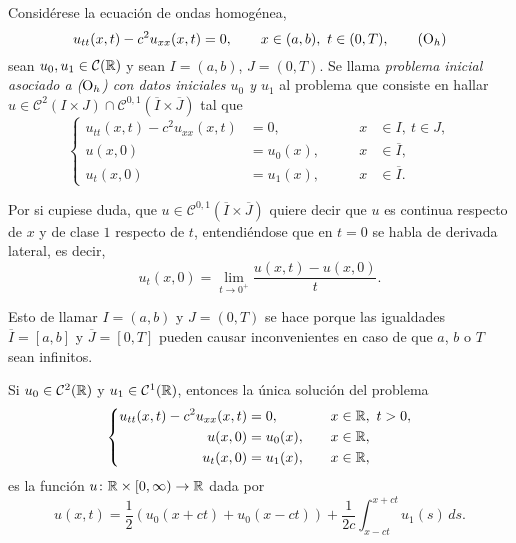 \documentclass[a4paper, 12pt, extrafontsizes]{memoir}
\begin{document}
\begin{definition}
    Considérese la ecuación de ondas homogénea,
    \[u_{tt}(x,t) - c^2u_{xx}(x,t) = 0, \qquad x \in (a,b), \ t \in (0,T), \tag{$\textup{O}_h$}\]
    sean $u_0,u_1 \in \mathcal{C}(\mathbb R)$ y sean $I = (a,b)$, $J = (0,T)$. Se llama \emph{problema inicial asociado a \textup{($\textup{O}_h$)} con datos iniciales $u_0$ y $u_1$} al problema que consiste en hallar $u \in \mathcal{C}^2(I \times J) \cap \mathcal{C}^{0,1}(\overline{I} \times \overline{J})$ tal que
    \[
    \left\{\begin{alignedat}{3}
        u_{tt}(x,t)-c^2u_{xx}(x,t) &= 0, \qquad & x &\in I, \ t \in J, \\
        u(x,0) &= u_0(x), \qquad & x &\in \overline{I}, \\
        u_t(x,0) &= u_1(x), \qquad & x &\in \overline{I}.
    \end{alignedat}\right.
    \]
\end{definition}

Por si cupiese duda, que $u \in \mathcal{C}^{0,1}(\overline{I} \times \overline{J})$ quiere decir que $u$ es continua respecto de $x$ y de clase $1$ respecto de $t$, entendiéndose que en $t=0$ se habla de derivada lateral, es decir, \[u_t(x,0) = \lim_{t \to 0^+} \frac{u(x,t)-u(x,0)}{t}.\]

Esto de llamar $I = (a,b)$ y $J = (0,T)$ se hace porque las igualdades $\overline{I} = [a,b]$ y $\overline{J} = [0,T]$ pueden causar inconvenientes en caso de que $a$, $b$ o $T$ sean infinitos.

\begin{theorem}
    Si $u_0 \in \mathcal{C}^2(\mathbb R)$ y $u_1 \in \mathcal{C}^1(\mathbb R)$, entonces la única solución del problema
        \[
        \left\{\begin{alignedat}{3}
            u_{tt}(x,t)-c^2u_{xx}(x,t) &= 0, \qquad & x &\in \mathbb R, \ t > 0, \\
            u(x,0) &= u_0(x), \qquad & x &\in \mathbb R, \\
            u_t(x,0) &= u_1(x), \qquad & x &\in \mathbb R,
        \end{alignedat}\right.
        \]
    es la función $u \colon \mathbb R \times [0,\infty) \to \mathbb R$ dada por
    \[u(x,t) = \frac{1}{2}(u_0(x+ct)+u_0(x-ct))+\frac{1}{2c}\int_{x-ct}^{x+ct}u_1(s) \, ds.\]
\end{theorem}
\end{document}
